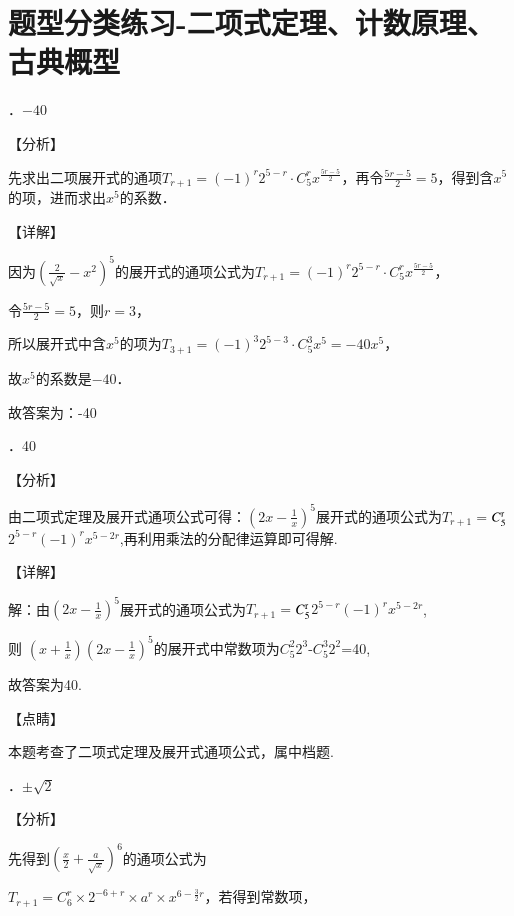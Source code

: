 \documentclass[a4paper,11pt,UTF8,twoside]{ctexart} %
\begin{document}
\section{题型分类练习-二项式定理、计数原理、古典概型}

．$-40$

\noindent 【分析】

\noindent 先求出二项展开式的通项$T_{r+1} =\left(-1\right)^{r} 2^{5-r} \cdot C_{5}^{r} x^{\frac{5r-5}{2} } $，再令$\frac{5r-5}{2} =5$，得到含$x^{5} $的项，进而求出$x^{5} $的系数．

\noindent 【详解】

\noindent 因为$\left(\frac{2}{\sqrt{x} } -x^{2} \right)^{5} $的展开式的通项公式为$T_{r+1} =\left(-1\right)^{r} 2^{5-r} \cdot C_{5}^{r} x^{\frac{5r-5}{2} } $，

\noindent 令$\frac{5r-5}{2} =5$，则$r=3$，

\noindent 所以展开式中含$x^{5} $的项为$T_{3+1} =\left(-1\right)^{3} 2^{5-3} \cdot C_{5}^{3} x^{5} =-40x^{5} $，

\noindent 故$x^{5} $的系数是$-40$．

\noindent 故答案为：-40

．40

\noindent 【分析】

\noindent 由二项式定理及展开式通项公式可得：$\left(2x-\frac{1}{x} \right)^{5} $展开式的通项公式为$T_{r+1} =$$C_{5}^{{\rm r}} $$2^{5-r} $$(-1)^{r} $$x^{5-2r} $,再利用乘法的分配律运算即可得解.

\noindent 【详解】

\noindent 解：由$\left(2x-\frac{1}{x} \right)^{5} $展开式的通项公式为$T_{r+1} =$$C_{5}^{{\rm r}} $$2^{5-r} $$(-1)^{r} $$x^{5-2r} $,

\noindent 则 $\left(x+\frac{1}{x} \right)\left(2x-\frac{1}{x} \right)^{5} $的展开式中常数项为$C_{5}^{2} $$2^{3} $-$C_{5}^{3} $$2^{2} $=40,

\noindent 故答案为40.

\noindent 【点睛】

\noindent 本题考查了二项式定理及展开式通项公式，属中档题.

．$\pm \sqrt{2} $

\noindent 【分析】

\noindent 先得到$\left(\frac{x}{2} +\frac{a}{\sqrt{x} } \right)^{6} $的通项公式为

\noindent $T_{r+1} =$$C_{6}^{r} \times 2^{-6+r} \times a^{r} \times x^{6-\frac{3}{2} r} $，若得到常数项，
\end{document}
